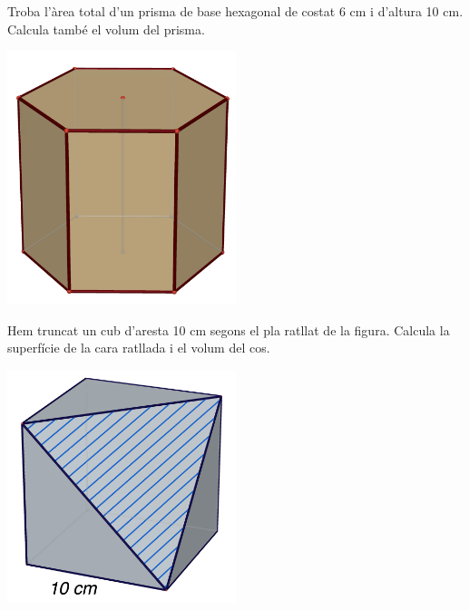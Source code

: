 \begin{mylist}
\vspace{-1.5cm}
\exer[2]\begin{minipage}[t]{0.7\textwidth}
Troba l'àrea total d'un prisma de base hexagonal de costat 6 cm i d'altura 10 cm. Calcula també el volum del prisma.
\end{minipage}
\begin{minipage}{0.3\textwidth}
	\centering
	\vspace{1.5cm}
	\includegraphics[width=0.5\textwidth]{img-12/prisma-hexagonal}
\end{minipage}
 
 
\vspace*{-1.5cm}
\exer[2]\begin{minipage}[t]{0.7\textwidth}
	 Hem truncat un cub d'aresta 10 cm segons el pla ratllat de la figura. Calcula la superfície de la cara ratllada i el volum del cos.
\end{minipage}
\begin{minipage}{0.3\textwidth}
	\centering
	\vspace{1.5cm}
	\includegraphics[width=0.5\textwidth]{img-12/cubtruncat}
\end{minipage}
	

\end{mylist}
